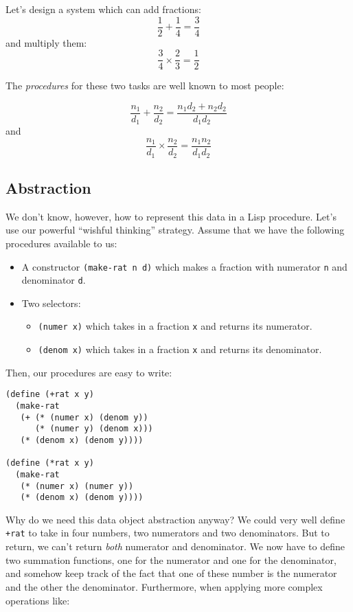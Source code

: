 \documentclass[9pt]{report}
\begin{document}
Let's design a system which can add fractions:
$$\frac{1}{2}+\frac{1}{4}=\frac{3}{4}$$
and multiply them:
$$\frac{3}{4}\times \frac{2}{3} = \frac{1}{2}$$

The \emph{procedures} for these two tasks are well known to most people:

$$\frac{n_1}{d_1} + \frac{n_2}{d_2} = \frac{n_1d_2+n_2d_2}{d_1d_2}$$
and
$$\frac{n_1}{d_1} \times \frac{n_2}{d_2} = \frac{n_1n_2}{d_1d_2}$$

\subsection{Abstraction}
\label{sec:org50affc6}
We don't know, however, how to represent this data in a Lisp
procedure. Let's use our powerful ``wishful thinking'' strategy.
Assume that we have the following procedures available to us:

\begin{itemize}
\item A constructor \texttt{(make-rat n d)} which makes a fraction with
numerator \texttt{n} and denominator \texttt{d}.
\item Two selectors:
\begin{itemize}
\item \texttt{(numer x)} which takes in a fraction \texttt{x} and returns its
numerator.
\item \texttt{(denom x)} which takes in a fraction \texttt{x} and returns its
denominator.
\end{itemize}
\end{itemize}

Then, our procedures are easy to write:

\begin{verbatim}
(define (+rat x y)
  (make-rat
   (+ (* (numer x) (denom y))
      (* (numer y) (denom x)))
   (* (denom x) (denom y))))

(define (*rat x y)
  (make-rat
   (* (numer x) (numer y))
   (* (denom x) (denom y))))
\end{verbatim}

Why do we need this data object abstraction anyway? We could very
well define \texttt{+rat} to take in four numbers, two numerators and two
denominators. But to return, we can't return \emph{both} numerator and
denominator. We now have to define two summation functions, one for
the numerator and one for the denominator, and somehow keep track
of the fact that one of these number is the numerator and the other
the denominator. Furthermore, when applying more complex operations
like:
\end{document}
